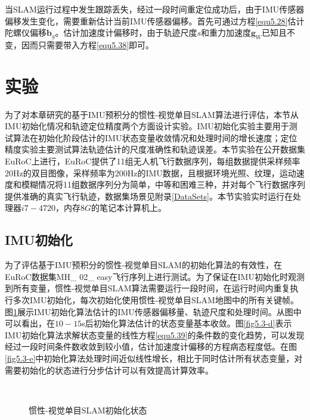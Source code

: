 当SLAM运行过程中发生跟踪丢失，经过一段时间重定位成功后，由于IMU传感器偏移发生变化，需要重新估计当前IMU传感器偏移。首先可通过方程\eqref{equ5.28}估计陀螺仪偏移$\boldsymbol{b}_g$。估计加速度计偏移时，由于轨迹尺度$s$和重力加速度$\boldsymbol{g}_W$已知且不变，因而只需要带入方程\eqref{equ5.38}即可。


\section{实验}
为了对本章研究的基于IMU预积分的惯性-视觉单目SLAM算法进行评估，本节从IMU初始化情况和轨迹定位精度两个方面设计实验。IMU初始化实验主要用于测试算法在初始化阶段估计的IMU状态变量收敛情况和处理时间的增长速度；定位精度实验主要测试算法轨迹估计的尺度准确性和轨迹误差。本节实验在公开数据集EuRoC\upcite{[5.4]}上进行，EuRoC提供了11组无人机飞行数据序列，每组数据提供采样频率$20$Hz的双目图像，采样频率为$200$Hz的IMU数据，且根据环境光照、纹理，运动速度和模糊情况将11组数据序列分为简单，中等和困难三种，并对每个飞行数据序列提供准确的真实飞行轨迹，数据集场景见附录\ref{DataSets}。本节实验实时运行在处理器$i7-4720$，内存$8G$的笔记本计算机上。

\subsection{IMU初始化}
为了评估基于IMU预积分的惯性-视觉单目SLAM的初始化算法的有效性，在EuRoC数据集MH\_ 02\_ easy飞行序列上进行测试。为了保证在IMU初始化时观测到所有变量，惯性-视觉单目SLAM算法需要运行一段时间，在运行时间内重复执行多次IMU初始化，每次初始化使用惯性-视觉单目SLAM地图中的所有关键帧。图\ref{fig5.3}展示IMU初始化算法估计的IMU传感器偏移量、轨迹尺度和处理时间。从图中可以看出，在$10-15$s后初始化算法估计的状态变量基本收敛。图\ref{fig5.3-d}表示IMU初始化算法求解状态变量的线性方程\eqref{equ5.39}的条件数的变化趋势，可以发现经过一段时间条件数收敛到较小值，估计加速度计偏移的方程病态程度低。在图\ref{fig5.3-e}中初始化算法处理时间近似线性增长，相比于同时估计所有状态变量\upcite{[5.5]}，对需要初始化的状态进行分步估计可以有效提高计算效率。

\begin{figure}[h]
    \centering
          \\
     \caption{惯性-视觉单目SLAM初始化状态}
\label{fig5.3}
\end{figure}        
          

